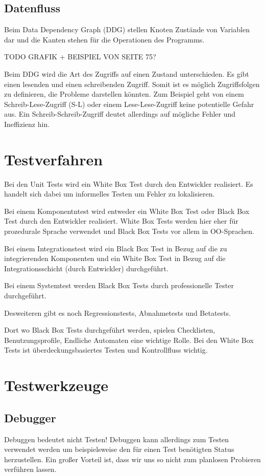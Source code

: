 \subsection{Datenfluss}
Beim Data Dependency Graph (DDG) stellen Knoten Zustände von Variablen dar und die Kanten stehen für die Operationen des Programms. 

TODO GRAFIK + BEISPIEL VON SEITE 75?

Beim DDG wird die Art des Zugriffs auf einen Zustand unterschieden. Es gibt einen lesenden und einen schreibenden Zugriff. Somit ist es möglich Zugriffsfolgen zu definieren, die Probleme darstellen könnten. Zum Beispiel geht von einem Schreib-Lese-Zugriff (S-L) oder einem Lese-Lese-Zugriff keine potentielle Gefahr aus. Ein Schreib-Schreib-Zugriff deutet allerdings auf mögliche Fehler und Ineffizienz hin. 

\section{Testverfahren}
Bei den Unit Tests wird ein White Box Test durch den Entwickler realisiert. Es handelt sich dabei um informelles Testen um Fehler zu lokalisieren. 

Bei einem Komponentntest wird entweder ein White Box Test oder Black Box Test durch den Entwickler realisiert. White Box Tests werden hier eher für prozedurale Sprache verwendet und Black Box Tests vor allem in OO-Sprachen.

Bei einem Integrationstest wird ein Black Box Test in Bezug auf die zu integrierenden Komponenten und ein White Box Test in Bezug auf die Integrationsschicht (durch Entwickler) durchgeführt. 

Bei einem Systemtest werden Black Box Tests durch professionelle Tester durchgeführt.

Desweiteren gibt es noch Regressionstests, Abnahmetests und Betatests. 

Dort wo Black Box Tests durchgeführt werden, spielen Checklisten, Benutzungsprofile, Endliche Automaten eine wichtige Rolle. Bei den White Box Tests ist überdeckungsbasiertes Testen und Kontrollfluss wichtig. 

\section{Testwerkzeuge}
\subsection{Debugger}
Debuggen bedeutet nicht Testen! Debuggen kann allerdings zum Testen verwendet werden um beispielsweise den für einen Test benötigten Status herzustellen. Ein großer Vorteil ist, dass wir uns so nicht zum planlosen Probieren verführen lassen.

